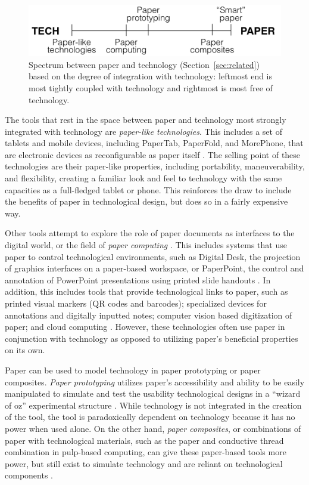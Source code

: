 \documentclass{sig-alternate}
\begin{document}
\begin{figure}
\centering
\includegraphics[width=\linewidth]{img/spectrum.png}
\caption{Spectrum between paper and technology (Section~\ref{sec:related}) based on the degree of integration with technology: leftmost end is most tightly coupled with technology and rightmost is most free of technology.}
\label{fig:spectrum}
\end{figure}

The tools that rest in the space between paper and technology most strongly integrated with technology are \emph{paper-like technologies}. This includes a set of tablets and mobile devices, including PaperTab, PaperFold, and MorePhone, that are electronic devices as reconfigurable as paper itself \cite{gomes2014,gomes2013,tarun2013}. The selling point of these technologies are their paper-like properties, including portability, maneuverability, and flexibility, creating a familiar look and feel to technology with the same capacities as a full-fledged tablet or phone. This reinforces the draw to include the benefits of paper in technological design, but does so in a fairly expensive way.

Other tools attempt to explore the role of paper documents as interfaces to the digital world, or the field of \emph{paper computing} \cite{kaplan2010}. This includes systems that use paper to control technological environments, such as Digital Desk, the projection of graphics interfaces on a paper-based workspace, or PaperPoint, the control and annotation of PowerPoint presentations using printed slide handouts \cite{newman1992,wellner1993,signer2007}. In addition, this includes tools that provide technological links to paper, such as printed visual markers (QR codes and barcodes); specialized devices for annotations and digitally inputted notes; computer vision based digitization of paper; and cloud computing \cite{kaplan2010,anoto,pietrzak2010}. However, these technologies often use paper in conjunction with technology as opposed to utilizing paper's beneficial properties on its own. 

Paper can be used to model technology in paper prototyping or paper composites. \emph{Paper prototyping} utilizes paper's accessibility and ability to be easily manipulated to simulate and test the usability technological designs in a ``wizard of oz'' experimental structure \cite{synder2001,chandler2002}. While technology is not integrated in the creation of the tool, the tool is paradoxically dependent on technology because it has no power when used alone. On the other hand, \emph{paper composites}, or combinations of paper with technological materials, such as the paper and conductive thread combination in pulp-based computing, can give these paper-based tools more power, but still exist to simulate technology and are reliant on technological components \cite{coelho2009}.
\end{document}
